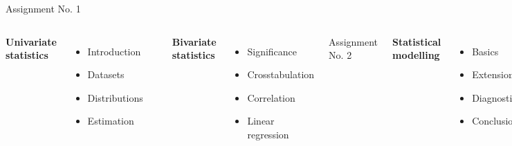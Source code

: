 \documentclass{beamer}
\begin{document}
	\begin{frame}[t]{Assignment No. 1}
	
	\begin{columns}[T]
	\textbf{Univariate\\statistics}
	
	\vspace{.55em}
	\begin{itemize}
		\item Introduction
		\item Datasets
		\item Distributions
		\item Estimation
	\end{itemize}
	\\[.5em]
	

	\textbf{Bivariate\\statistics}
	
	\begin{itemize}
		\item Significance
		\item Crosstabulation
		\item Correlation
		\item Linear regression
	\end{itemize}
	Assignment No. 2

	\textbf{Statistical\\modelling}
	
	\begin{itemize}
		\item Basics
		\item Extensions
		\item Diagnostics
		\item Conclusion
	\end{itemize}
	Final paper\\[.5em]
	\end{columns}
	
	\end{frame}
	
\end{document}
